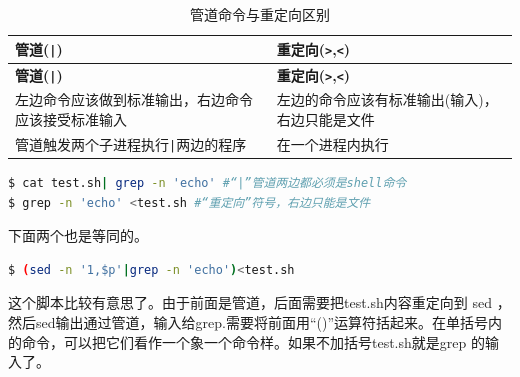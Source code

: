 \documentclass[doctor,openright,twoside]{sjtuthesis}
\newcommand{\passthrough}[1]{#1}
\theoremstyle{plain}
\theoremstyle{definition}
\theoremstyle{remark}
\theoremstyle{ocrenumbox}
\theoremstyle{plain}
\begin{document}
\begin{longtable}[]{@{}ll@{}}
\caption{管道命令与重定向区别}\tabularnewline
\toprule
\begin{minipage}[b]{0.55\columnwidth}\raggedright
\textbf{管道(\passthrough{\lstinline!|!})}\strut
\end{minipage} & \begin{minipage}[b]{0.40\columnwidth}\raggedright
\textbf{重定向(\passthrough{\lstinline!>!},\passthrough{\lstinline!<!})}\strut
\end{minipage}\tabularnewline
\midrule
\endfirsthead
\toprule
\begin{minipage}[b]{0.55\columnwidth}\raggedright
\textbf{管道(\passthrough{\lstinline!|!})}\strut
\end{minipage} & \begin{minipage}[b]{0.40\columnwidth}\raggedright
\textbf{重定向(\passthrough{\lstinline!>!},\passthrough{\lstinline!<!})}\strut
\end{minipage}\tabularnewline
\midrule
\endhead
\begin{minipage}[t]{0.55\columnwidth}\raggedright
左边命令应该做到标准输出，右边命令应该接受标准输入\strut
\end{minipage} & \begin{minipage}[t]{0.40\columnwidth}\raggedright
左边的命令应该有标准输出(输入)，右边只能是文件\strut
\end{minipage}\tabularnewline
\begin{minipage}[t]{0.55\columnwidth}\raggedright
管道触发两个子进程执行\passthrough{\lstinline!|!}两边的程序\strut
\end{minipage} & \begin{minipage}[t]{0.40\columnwidth}\raggedright
在一个进程内执行\strut
\end{minipage}\tabularnewline
\bottomrule
\end{longtable}

\begin{lstlisting}[language=bash]
$ cat test.sh| grep -n 'echo' #“|”管道两边都必须是shell命令
$ grep -n 'echo' <test.sh #“重定向”符号，右边只能是文件
\end{lstlisting}

下面两个也是等同的。

\begin{lstlisting}[language=bash]
$ (sed -n '1,$p'|grep -n 'echo')<test.sh 
\end{lstlisting}

这个脚本比较有意思了。由于前面是管道，后面需要把test.sh内容重定向到 sed
，然后sed输出通过管道，输入给grep.需要将前面用``()''运算符括起来。在单括号内的命令，可以把它们看作一个象一个命令样。如果不加括号test.sh就是grep
的输入了。
\end{document}

